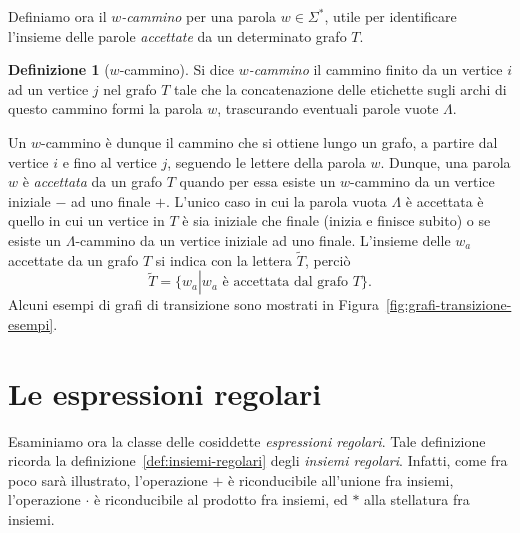\documentclass[10pt]{\classname}
\theoremstyle{newlinethm}
\theoremstyle{theorem}
\theoremstyle{definition}
\newtheorem{definizione}{Definizione}[section]
\theoremstyle{definition}
\theoremstyle{definition}
\theoremstyle{definition}
\begin{document}
Definiamo ora il \emph{$w$-cammino} per una parola $w \in \Sigma^*$, utile per identificare l'insieme delle parole \emph{accettate} da un determinato grafo $T$.

\begin{definizione}[$w$-cammino]
    Si dice \emph{$w$-cammino} il cammino finito da un vertice $i$ ad un vertice $j$ nel grafo $T$ tale che la concatenazione delle etichette sugli archi di questo cammino formi la parola $w$, trascurando eventuali parole vuote $\Lambda$. 
\end{definizione}

Un $w$-cammino è dunque il cammino che si ottiene lungo un grafo, a partire dal vertice $i$ e fino al vertice $j$, seguendo le lettere della parola $w$. Dunque, una parola $w$ è \emph{accettata} da un grafo $T$ quando per essa esiste un $w$-cammino da un vertice iniziale $-$ ad uno finale $+$. L'unico caso in cui la parola vuota $\Lambda$ è accettata è quello in cui un vertice in $T$ è sia iniziale che finale (inizia e finisce subito) o se esiste un $\Lambda$-cammino da un vertice iniziale ad uno finale. L'insieme delle $w_a$ accettate da un grafo $T$ si indica con la lettera $\tilde{T}$, perciò \[\tilde T = \{w_a \left|\right. w_a \mbox{ è accettata dal grafo } T\}.\] Alcuni esempi di grafi di transizione sono mostrati in Figura~\ref{fig:grafi-transizione-esempi}.


\section{Le espressioni regolari}

Esaminiamo ora la classe delle cosiddette \emph{espressioni regolari}. Tale definizione ricorda la definizione~\ref{def:insiemi-regolari} degli \emph{insiemi regolari}. Infatti, come fra poco sarà illustrato, l'operazione $+$ è riconducibile all'unione fra insiemi, l'operazione $\cdot$ è riconducibile al prodotto fra insiemi, ed $*$ alla stellatura fra insiemi.
\end{document}
